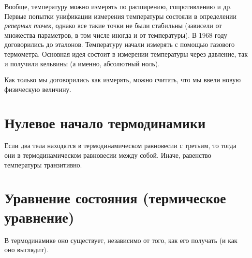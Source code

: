 \documentclass[../main.tex]{subfiles}
\begin{document}
    Вообще, температуру можно измерять по расширению, сопротивлению и др. Первые попытки унификации измерения температуры состояли в определении \emph{реперных точек}, однако все такие точки не были стабильны (зависели от множества параметров, в том числе иногда и от температуры). В 1968 году договорились до эталонов. Температуру начали измерять с помощью газового термометра. Основная идея состоит в измерении температуры через давление, так и получили кельвины (а именно, абсолютный ноль). 

    Как только мы договорились как измерять, можно считать, что мы ввели новую физическую величину.

    \section{Нулевое начало термодинамики}

    \begin{proposition}
        Если два тела находятся в термодинамическом равновесии с третьим, то тогда они в термодинамическом равновесии между собой. Иначе, равенство температуры транзитивно.
    \end{proposition}
    
    \section{Уравнение состояния (термическое уравнение)}

    \begin{note}
        В термодинамике оно существует, независимо от того, как его получать (и как оно выглядит).
    \end{note}
\end{document}

